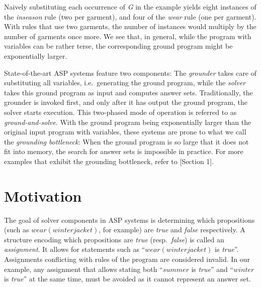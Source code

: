 \documentclass{vutinfth} %
\begin{document}
Naively substituting each occurrence of \emph{G} in the example yields eight instances of the \emph{inseason} rule (two per garment), and four of the \emph{wear} rule (one per garment). With rules that use two garments, the number of instances would multiply by the number of garments once more. We see that, in general, while the program with variables can be rather terse, the corresponding ground program might be exponentially larger.

State-of-the-art ASP systems feature two components: The \emph{grounder} takes care of substituting all variables, i.e.~generating the ground program, while the \emph{solver} takes this ground program as input and computes answer sets. Traditionally, the grounder is invoked first, and only after it has output the ground program, the solver starts execution. This two-phased mode of operation is referred to as \emph{ground-and-solve}. With the ground program being exponentially larger than the original input program with variables, these systems are prone to what we call the \emph{grounding bottleneck}: When the ground program is so large that it does not fit into memory, the search for answer sets is impossible in practice. For more examples that exhibit the grounding bottleneck, refer to \cite{asperix}[Section 1].

\section{Motivation}
\label{sec:motivation}

The goal of solver components in ASP systems is determining which propositions (such as $wear(winterjacket)$, for example) are \emph{true} and \emph{false} respectively. A structure encoding which propositions are \emph{true} (resp.~\emph{false}) is called an \emph{assignment}. It allows for statements such as \enquote{$wear(winterjacket)$ is \emph{true}}. Assignments conflicting with rules of the program are considered invalid. In our example, any assignment that allows stating both \enquote{$summer$ is \emph{true}} and \enquote{$winter$ is \emph{true}} at the same time, must be avoided as it cannot represent an answer set.
\end{document}
